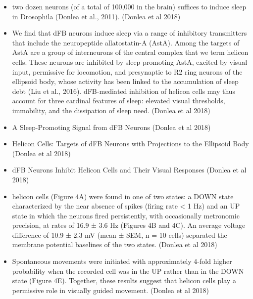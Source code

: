 \documentclass[11pt]{article}
\begin{document}
\begin{itemize}
    \item two dozen neurons (of a total of 100,000 in the brain) suffices to induce sleep in Drosophila (Donlea et al., 2011).
    \parencite{donleaRecurrentCircuitryBalancing2018} (Donlea et al 2018)

    \item We find that dFB neurons induce sleep via a range of inhibitory transmitters that include the neuropeptide allatostatin-A (AstA). Among the targets of AstA are a group of interneurons of the central complex that we term helicon cells. These neurons are inhibited by sleep-promoting AstA, excited by visual input, permissive for locomotion, and presynaptic to R2 ring neurons of the ellipsoid body, whose activity has been linked to the accumulation of sleep debt (Liu et al., 2016). dFB-mediated inhibition of helicon cells may thus account for three cardinal features of sleep: elevated visual thresholds, immobility, and the dissipation of sleep need.
    \parencite{donleaRecurrentCircuitryBalancing2018} (Donlea et al 2018)

    \item A Sleep-Promoting Signal from dFB Neurons
    \parencite{donleaRecurrentCircuitryBalancing2018} (Donlea et al 2018)

    \item Helicon Cells: Targets of dFB Neurons with Projections to the Ellipsoid Body
    \parencite{donleaRecurrentCircuitryBalancing2018} (Donlea et al 2018)

    \item dFB Neurons Inhibit Helicon Cells and Their Visual Responses
    \parencite{donleaRecurrentCircuitryBalancing2018} (Donlea et al 2018)

    \item helicon cells (Figure 4A) were found in one of two states: a DOWN state characterized by the near absence of spikes (firing rate < 1 Hz) and an UP state in which the neurons fired persistently, with occasionally metronomic precision, at rates of 16.9 ± 3.6 Hz (Figures 4B and 4C). An average voltage difference of 10.9 ± 2.3 mV (mean ± SEM, n = 10 cells) separated the membrane potential baselines of the two states.
    \parencite{donleaRecurrentCircuitryBalancing2018} (Donlea et al 2018)

    \item Spontaneous movements were initiated with approximately 4-fold higher probability when the recorded cell was in the UP rather than in the DOWN state (Figure 4E). Together, these results suggest that helicon cells play a permissive role in visually guided movement.
    \parencite{donleaRecurrentCircuitryBalancing2018} (Donlea et al 2018)


\end{itemize}
\end{document}
